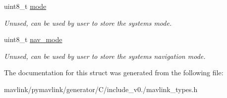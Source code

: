 \begin{DoxyCompactItemize}
\mbox{\label{struct____mavlink__system_a4bd3edea462570856b5575eecafd2b6d}} 
uint8\+\_\+t \hyperlink{struct____mavlink__system_a4bd3edea462570856b5575eecafd2b6d}{mode}
\begin{DoxyCompactList}\small\item\em Unused, can be used by user to store the system\textquotesingle{}s mode. \end{DoxyCompactList}\item 
\mbox{\label{struct____mavlink__system_ae653c03239304982024c03ac165c5011}} 
uint8\+\_\+t \hyperlink{struct____mavlink__system_ae653c03239304982024c03ac165c5011}{nav\+\_\+mode}
\begin{DoxyCompactList}\small\item\em Unused, can be used by user to store the system\textquotesingle{}s navigation mode. \end{DoxyCompactList}\end{DoxyCompactItemize}


The documentation for this struct was generated from the following file\+:\begin{DoxyCompactItemize}
\item 
mavlink/pymavlink/generator/\+C/include\+\_\+v0./mavlink\+\_\+types.\+h\end{DoxyCompactItemize}
